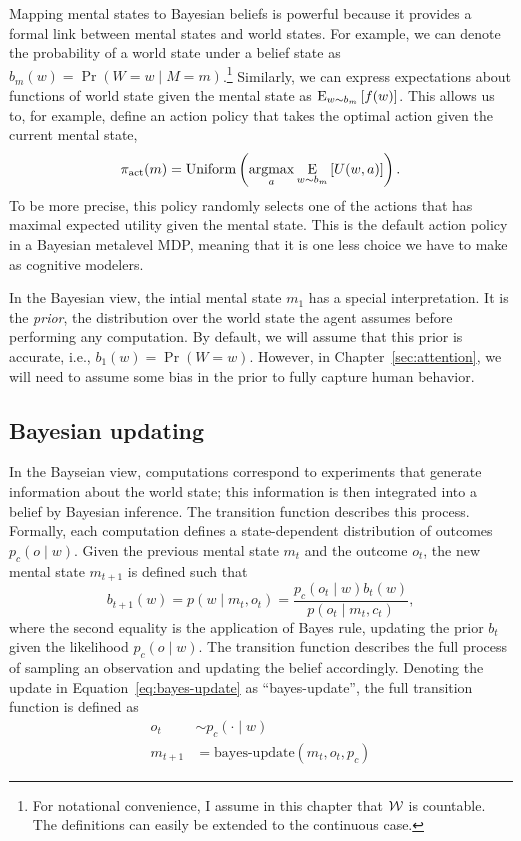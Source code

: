 Mapping mental states to Bayesian beliefs is powerful because it provides a formal link between mental states and world states. For example, we can denote the probability of a world state under a belief state as $b_m(w) = \Pr(W = w \mid M = m)$.\footnote{%
  For notational convenience, I assume in this chapter that $\W$ is countable. The definitions can easily be extended to the continuous case.
} Similarly, we can express expectations about functions of world state given the mental state as $\expectunder{f(w)}{w \sim b_m}$. This allows us to, for example, define an action policy that takes the optimal action given the current mental state,
\begin{equation}
  \pi\act(m) = \Uniform \left(\argmax_a \expectunder{U(w, a)}{w \sim b_m}\right).
\end{equation}
%
To be more precise, this policy randomly selects one of the actions that has maximal expected utility given the mental state. This is the default action policy in a Bayesian metalevel MDP, meaning that it is one less choice we have to make as cognitive modelers.

In the Bayesian view, the intial mental state $m_1$ has a special interpretation. It is the \emph{prior}, the distribution over the world state the agent assumes before performing any computation. By default, we will assume that this prior is accurate, i.e., $b_1(w) = \Pr(W=w)$. However, in Chapter~\ref{sec:attention}, we will need to assume some bias in the prior to fully capture human behavior.

\subsection{Bayesian updating}

In the Bayseian view, computations correspond to experiments that generate information about the world state; this information is then integrated into a belief by Bayesian inference. The transition function describes this process. Formally, each computation defines a state-dependent distribution of outcomes $p_c(o \mid w)$. Given the previous mental state $m_t$ and the outcome $o_t$, the new mental state $m_{t+1}$ is defined such that
%
\begin{equation}\label{eq:bayes-update}
  b_{t+1}(w) = p(w \mid m_t, o_t) = \frac{
    p_c(o_t \mid w) b_t(w) 
  }{
    p(o_t \mid m_t, c_t)
  },
\end{equation}
%
where the second equality is the application of Bayes rule, updating the prior $b_t$ given the likelihood $p_c(o \mid w)$. The transition function describes the full process of sampling an observation and updating the belief accordingly. Denoting the update in Equation~\ref{eq:bayes-update} as ``bayes-update'', the full transition function is defined as
%
\begin{equation}\label{eq:bayes-transition}
\begin{aligned}
  o_t &\sim p_c(\cdot \mid w) \\
  m_{t+1} &= \text{bayes-update}(m_t, o_t, p_c)
\end{aligned}
\end{equation}

